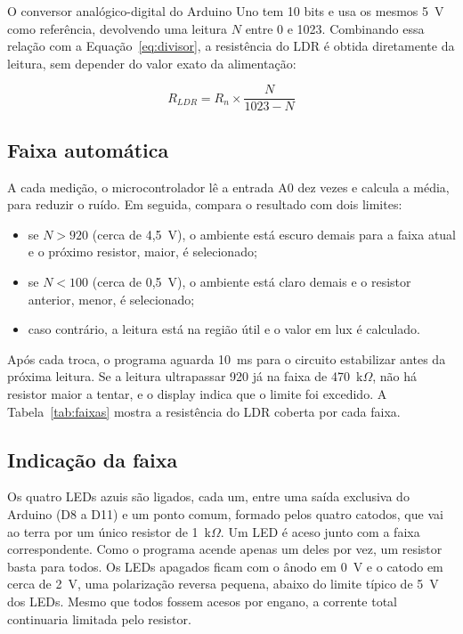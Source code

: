 \documentclass[11pt,a4paper]{article}
\begin{document}
O conversor analógico-digital do Arduino Uno tem 10 bits e usa os mesmos 5~V como referência, devolvendo uma leitura $N$ entre 0 e 1023. Combinando essa relação com a Equação~\ref{eq:divisor}, a resistência do LDR é obtida diretamente da leitura, sem depender do valor exato da alimentação:

\begin{equation}
	R_{LDR} = R_n \times \frac{N}{1023 - N}
	\label{eq:resistencia}
\end{equation}

\subsection*{Faixa automática}

A cada medição, o microcontrolador lê a entrada A0 dez vezes e calcula a média, para reduzir o ruído. Em seguida, compara o resultado com dois limites:

\begin{itemize}
	\item se $N > 920$ (cerca de 4,5~V), o ambiente está escuro demais para a faixa atual e o próximo resistor, maior, é selecionado;
	\item se $N < 100$ (cerca de 0,5~V), o ambiente está claro demais e o resistor anterior, menor, é selecionado;
	\item caso contrário, a leitura está na região útil e o valor em lux é calculado.
\end{itemize}

Após cada troca, o programa aguarda 10~ms para o circuito estabilizar antes da próxima leitura. Se a leitura ultrapassar 920 já na faixa de 470~k$\Omega$, não há resistor maior a tentar, e o display indica que o limite foi excedido. A Tabela~\ref{tab:faixas} mostra a resistência do LDR coberta por cada faixa.

\subsection*{Indicação da faixa}

Os quatro LEDs azuis são ligados, cada um, entre uma saída exclusiva do Arduino (D8 a D11) e um ponto comum, formado pelos quatro catodos, que vai ao terra por um único resistor de 1~k$\Omega$. Um LED é aceso junto com a faixa correspondente. Como o programa acende apenas um deles por vez, um resistor basta para todos. Os LEDs apagados ficam com o ânodo em 0~V e o catodo em cerca de 2~V, uma polarização reversa pequena, abaixo do limite típico de 5~V dos LEDs. Mesmo que todos fossem acesos por engano, a corrente total continuaria limitada pelo resistor.
\end{document}
